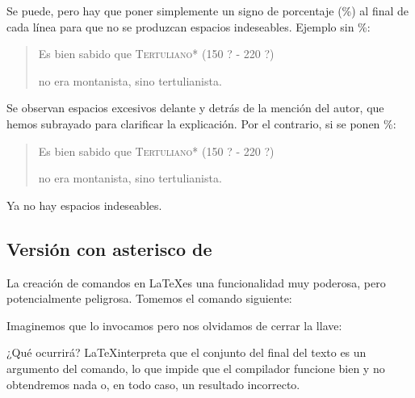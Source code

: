 Se puede, pero hay que poner simplemente un signo de porcentaje (\%) al final de cada línea para que no se produzcan espacios indeseables. Ejemplo sin \%{}:

\begin{latexcode}
\newcommand{\autor}[2]{
    \textsc{#1}* (#2)
    }
\end{latexcode}

\renewcommand{\autor}[2]{\underline{ }%
    \textsc{#1}* (#2)\underline{ }%
}

\begin{quotation}
Es bien sabido que \autor{Tertuliano}{150 ? - 220 ?}
no era montanista, sino tertulianista.
\end{quotation}

Se observan espacios excesivos delante y detrás de la mención del autor, que hemos subrayado para clarificar la explicación. Por el contrario, si se ponen \%:

\begin{latexcode}
\newcommand{\autor}[2]{%
    \textsc{#1}* (#2)%
    }
\end{latexcode}

\renewcommand{\autor}[2]{%
    \textsc{#1}* (#2)%
}

\begin{quotation}
Es bien sabido que \autor{Tertuliano}{150 ? - 220 ?}
no era montanista, sino tertulianista.
\end{quotation}

Ya no hay espacios indeseables.


\subsection{Versión con asterisco de }

La creación de comandos en \LaTeX es una funcionalidad muy poderosa, pero potencialmente peligrosa. Tomemos el comando siguiente:


\begin{latexcode}
\newcommand{\autor}[1]{\textsc{#1}*}
\end{latexcode}

Imaginemos que lo invocamos pero nos olvidamos de cerrar la llave:

\begin{latexcode}
Es bien sabido que \autor{Tertuliano
no era montanista, sino tertulianista.
\end{latexcode}

¿Qué ocurrirá? \LaTeX interpreta que el conjunto del final del texto es un argumento del comando, lo que impide que el compilador funcione bien y no obtendremos nada o, en todo caso, un resultado incorrecto.

